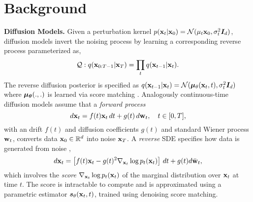 \section{Background}
\label{sec:background}
\textbf{Diffusion Models.} Given a perturbation kernel $p({\mathbf{x}}_t|{\mathbf{x}}_0)={\mathcal{N}}(\mu_t{\mathbf{x}}_0, \sigma_t^2{\bm{I}}_d)$, diffusion models \citep{sohl2015deep, ho2020denoising} invert the noising process by learning a corresponding reverse process parameterized as,
\begin{equation}
\label{eq:unguided-diffusion}
{\mathcal{Q}}: q({\mathbf{x}}_{0:T-1}|{\mathbf{x}}_T) = \prod_{t} q({\mathbf{x}}_{t-1}|{\mathbf{x}}_t).
\end{equation}
The reverse diffusion posterior is specified as $q({\mathbf{x}}_{t-1}|{\mathbf{x}}_t) = {\mathcal{N}}({\bm{\mu}}_\theta({\mathbf{x}}_t, t), \sigma_t^2{\bm{I}}_d)$ where ${\bm{\mu}}_{\bm{\theta}}(.,.)$ is learned via score matching \citep{hyvarinen2005estimation,vincent2011connection,song2019generative}. Analogously continuous-time diffusion models \citep{songscore, karraselucidating} assume that a \textit{forward process}
\begin{equation}
    d{\mathbf{x}}_t = f(t){\mathbf{x}}_t \, dt + g(t) \, d{\mathbf{w}}_t, \quad t \in [0, T],
    \label{eqn:fwd_process}
\end{equation}
with an drift $f(t)$ and diffusion coefficients $g(t)$ and standard Wiener process ${\mathbf{w}}_t$, converts data ${\mathbf{x}}_0 \in \mathbb{R}^d$ into noise ${\mathbf{x}}_T$. A \textit{reverse } SDE specifies how data is generated from noise \citep{ANDERSON1982313, songscore},
\begin{equation}
    d {\mathbf{x}}_t = \left[f(t){\mathbf{x}}_t - g(t)^2 \nabla_{{\mathbf{x}}_t} \log p_t({\mathbf{x}}_t)\right] \, dt + g(t) d\bar {{\mathbf{w}}}_t,
    \label{eq:reverse_time_diffusion}
\end{equation}
which involves the \textit{score} $\nabla_{{\mathbf{x}}_t} \log p_t({\mathbf{x}}_t)$ of the marginal distribution over ${\mathbf{x}}_t$ at time $t$. The score is intractable to compute and is approximated using a parametric estimator ${\bm{s}}_{\theta}({\mathbf{x}}_t, t)$, trained using denoising score matching.

